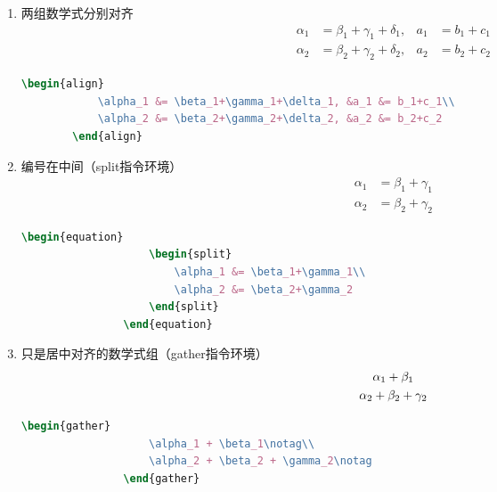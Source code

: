 \begin{enumerate}
    \item 两组数学式分别对齐
    \begin{align}
        \alpha_1 &= \beta_1+\gamma_1+\delta_1, &a_1 &= b_1+c_1\\
        \alpha_2 &= \beta_2+\gamma_2+\delta_2, &a_2 &= b_2+c_2
    \end{align}
\begin{lstlisting}[language=TeX,numbers=none,frame=lrtb,keywords={begin}]
		\begin{align}
			\alpha_1 &= \beta_1+\gamma_1+\delta_1, &a_1 &= b_1+c_1\\
			\alpha_2 &= \beta_2+\gamma_2+\delta_2, &a_2 &= b_2+c_2
		\end{align}
\end{lstlisting}

    \item 编号在中间（split指令环境）
        \begin{equation}
            \begin{split}
                \alpha_1 &= \beta_1+\gamma_1\\
                \alpha_2 &= \beta_2+\gamma_2
            \end{split}
        \end{equation}
\begin{lstlisting}[language=TeX,numbers=none,frame=lrtb,keywords={begin}]
				\begin{equation}
					\begin{split}
						\alpha_1 &= \beta_1+\gamma_1\\
						\alpha_2 &= \beta_2+\gamma_2
					\end{split}
				\end{equation}
\end{lstlisting}

    \item 只是居中对齐的数学式组（gather指令环境）
        \begin{gather}
        \alpha_1 + \beta_1\notag\\
        \alpha_2 + \beta_2 + \gamma_2\notag
        \end{gather}
\begin{lstlisting}[language=TeX,numbers=none,frame=lrtb,keywords={begin}]
				\begin{gather}
					\alpha_1 + \beta_1\notag\\
					\alpha_2 + \beta_2 + \gamma_2\notag
				\end{gather}
\end{lstlisting}


\end{enumerate}

